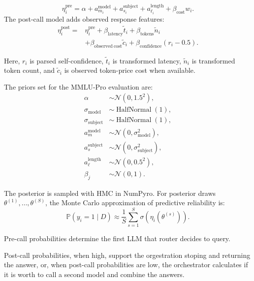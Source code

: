 \documentclass[11pt]{article}
\begin{document}
\begin{equation*}
\eta_i^{\mathrm{pre}}
=
\alpha
+a^{\mathrm{model}}_{m_i}
+a^{\mathrm{subject}}_{s_i}
+a^{\mathrm{length}}_{\ell_i}
+\beta_{\mathrm{cost}}w_i.
\end{equation*}
The post-call model adds observed response features:
\begin{equation*}
\begin{aligned}
\eta_i^{\mathrm{post}}={}&
\eta_i^{\mathrm{pre}}
+\beta_{\mathrm{latency}}\widetilde{t}_i
+\beta_{\mathrm{tokens}}\widetilde{n}_i \\
&+\beta_{\mathrm{observed\ cost}}\widetilde{c}_i
+\beta_{\mathrm{confidence}}(r_i-0.5).
\end{aligned}
\end{equation*}

Here, $r_i$ is parsed self-confidence, $\widetilde{t}_i$ is transformed latency, $\widetilde{n}_i$ is transformed token count, and $\widetilde{c}_i$ is observed token-price cost when available.

The priors set for the MMLU-Pro evaluation are:
\begin{equation*}
\begin{aligned}
\alpha &\sim\mathcal{N}(0,1.5^2), \\
\sigma_{\mathrm{model}} &\sim\operatorname{HalfNormal}(1), \\
\sigma_{\mathrm{subject}} &\sim\operatorname{HalfNormal}(1), \\
a^{\mathrm{model}}_m &\sim\mathcal{N}(0,\sigma_{\mathrm{model}}^2), \\
a^{\mathrm{subject}}_s &\sim\mathcal{N}(0,\sigma_{\mathrm{subject}}^2), \\
a^{\mathrm{length}}_\ell &\sim\mathcal{N}(0,0.5^2), \\
\beta_j &\sim\mathcal{N}(0,1).
\end{aligned}
\end{equation*}

The posterior is sampled with HMC in NumPyro.
For posterior draws $\theta^{(1)},\ldots,\theta^{(S)}$, the Monte Carlo approximation of predictive reliability is:
\begin{equation*}
\mathbb{P}(y_i=1\mid D)
\approx
\frac{1}{S}\sum_{s=1}^{S}
\sigma\!\left(\eta_i(\theta^{(s)})\right).
\end{equation*}

Pre-call probabilities determine the first LLM that router decides to query. 

Post-call probabilities, when high, support the orgestration stoping and returning the answer, or, when post-call probabilities are low, the orchestrator calculates if it is worth to call a second model and combine the answers. 
\end{document}
